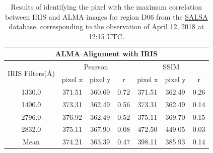 \documentclass[a4paper,alpha-refs]{eSpectra}
\begin{document}
\begin{table}[h]
\centering
\caption{Results of identifying the pixel with the maximum correlation between IRIS and ALMA images for region D06 from the \href{http://sdc.uio.no/salsa/}{SALSA} database, corresponding to the observation of April 12, 2018 at 12:15 UTC.}
\begin{tabular}{ccccccc}
\hline
\hline
\multicolumn{7}{c}{ALMA Alignment with IRIS}                                                                                      \\ \hline
\multicolumn{1}{c|}{\multirow{2}{*}{IRIS  Filters(Å)}} & \multicolumn{3}{c|}{Pearson}                  & \multicolumn{3}{c}{SSIM} \\ \cline{2-7} 
\multicolumn{1}{c|}{}                                  & pixel x & pixel y & \multicolumn{1}{c|}{r}    & pixel x & pixel y & r    \\ \hline
\multicolumn{1}{c|}{1330.0}                            & 371.51  & 360.69  & \multicolumn{1}{c|}{0.72} & 371.51  & 362.49  & 0.26 \\
\multicolumn{1}{c|}{1400.0}                            & 373.31  & 362.49  & \multicolumn{1}{c|}{0.56} & 373.31  & 362.49  & 0.14 \\
\multicolumn{1}{c|}{2796.0}                            & 376.92  & 362.49  & \multicolumn{1}{c|}{0.52} & 375.11  & 369.70  & 0.15 \\
\multicolumn{1}{c|}{2832.0}                            & 375.11  & 367.90  & \multicolumn{1}{c|}{0.08} & 472.50  & 449.05  & 0.03 \\
\multicolumn{1}{c|}{Mean}                              & 374.21  & 363.39  & \multicolumn{1}{c|}{0.47} & 398.11  & 385.93  & 0.14 \\ \hline
\end{tabular}
\label{chap_2:result_IRIS_and_ALMA_align}
\end{table}
\end{document}
